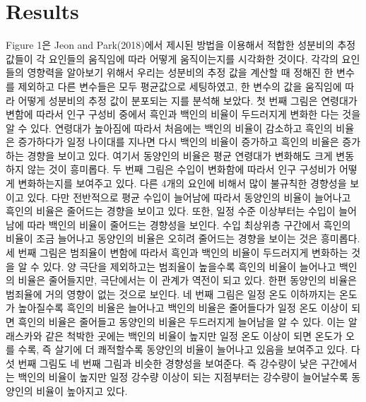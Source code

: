 \section{Results}\label{sec:results}


Figure 1은 Jeon and Park(2018)에서 제시된 방법을 이용해서 적합한 성분비의 추정 값들이 각 요인들의 움직임에 따라 어떻게 움직이는지를 시각화한 것이다. 각각의 요인들의 영향력을 알아보기 위해서 우리는 성분비의 추정 값을 계산할 때 정해진 한 변수를 제외하고 다른 변수들은 모두 평균값으로 세팅하였고, 한 변수의 값을 움직임에 따라 어떻게 성분비의 추정 값이 분포되는 지를 분석해 보았다. 첫 번째 그림은 연령대가 변함에 따라서 인구 구성비 중에서 흑인과 백인의 비율이 두드러지게 변화한 다는 것을 알 수 있다. 연령대가 높아짐에 따라서 처음에는 백인의 비율이 감소하고 흑인의 비율은 증가하다가 일정 나이대를 지나면 다시 백인의 비율이 증가하고 흑인의 비율은 증가하는 경향을 보이고 있다. 여기서 동양인의 비율은 평균 연령대가 변화해도 크게 변동하지 않는 것이 흥미롭다. 두 번째 그림은 수입이 변화함에 따라서 인구 구성비가 어떻게 변화하는지를 보여주고 있다. 다른 4개의 요인에 비해서 많이 불규칙한 경향성을 보이고 있다. 다만 전반적으로 평균 수입이 늘어남에 따라서 동양인의 비율이 늘어나고 흑인의 비율은 줄어드는 경향을 보이고 있다. 또한, 일정 수준 이상부터는 수입이 늘어남에 따라 백인의 비율이 줄어드는 경향성을 보인다. 수입 최상위층 구간에서 흑인의 비율이 조금 늘어나고 동양인의 비율은 오히려 줄어드는 경향을 보이는 것은 흥미롭다. 세 번째 그림은 범죄율이 변함에 따라서 흑인과 백인의 비율이 두드러지게 변화하는 것을 알 수 있다. 양 극단을 제외하고는 범죄율이 높을수록 흑인의 비율이 늘어나고 백인의 비율은 줄어들지만, 극단에서는 이 관계가 역전이 되고 있다. 한편 동양인의 비율은 범죄율에 거의 영향이 없는 것으로 보인다. 네 번째 그림은 일정 온도 이하까지는 온도가 높아질수록 흑인의 비율은 늘어나고 백인의 비율은 줄어들다가 일정 온도 이상이 되면 흑인의 비율은 줄어들고 동양인의 비율은 두드러지게 늘어남을 알 수 있다. 이는 알래스카와 같은 척박한 곳에는 백인의 비율이 높지만 일정 온도 이상이 되면 온도가 오를 수록, 즉 살기에 더 쾌적할수록 동양인의 비율이 늘어나고 있음을 보여주고 있다. 다섯 번째 그림도 네 번째 그림과 비슷한 경향성을 보여준다. 즉 강수량이 낮은 구간에서는 백인의 비율이 높지만 일정 강수량 이상이 되는 지점부터는 강수량이 늘어날수록 동양인의 비율이 높아지고 있다.


